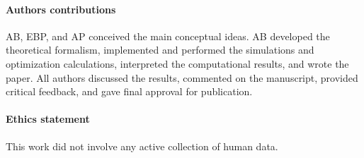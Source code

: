 \documentclass{article}
\begin{document}
\paragraph{Authors contributions}
AB, EBP, and AP conceived the main conceptual ideas. AB developed the theoretical formalism, implemented and performed the simulations and optimization calculations, interpreted the computational results, and wrote the paper. All authors discussed the results, commented on the manuscript, provided critical feedback, and gave final approval for publication.

\paragraph{Ethics statement}
This work did not involve any active collection of human data.



\end{document}
